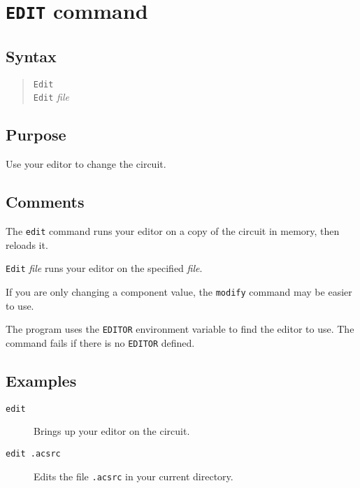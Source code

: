 \section{{\tt EDIT} command}
\subsection{Syntax}
\begin{verse}
{\tt Edit} \\
{\tt Edit} {\it file}
\end{verse}
\subsection{Purpose}

Use your editor to change the circuit.
\subsection{Comments}

The {\tt edit} command runs your editor on a copy of the circuit in memory, 
then reloads it.

{\tt Edit} {\it file} runs your editor on the specified {\it file}.

If you are only changing a component value, the {\tt modify} command may be
easier to use.

The program uses the {\tt EDITOR} environment variable to find the editor
to use.  The command fails if there is no {\tt EDITOR} defined.
\subsection{Examples}

\begin{description}

\item[{\tt edit}] Brings up your editor on the circuit.

\item[{\tt edit .acsrc}] Edits the file {\tt .acsrc} in your current directory.

\end{description}
